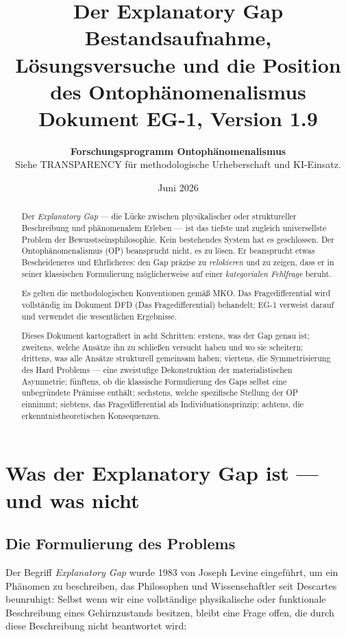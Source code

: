 \documentclass[11pt,a4paper]{article}
\title{
  \textbf{Der Explanatory Gap}\\[0.4em]
  \large Bestandsaufnahme, L\"{o}sungsversuche und die Position\\
  des Ontoph\"{a}nomenalismus\\[0.5em]
  {\normalsize Dokument EG-1, Version 1.9}
}
\author{
  \textbf{Forschungsprogramm Ontoph\"{a}nomenalismus}\\
  \small Siehe TRANSPARENCY f\"{u}r methodologische Urheberschaft und KI-Einsatz.
}
\date{Juni 2026}
\theoremstyle{plain}
\theoremstyle{definition}
\begin{document}
\maketitle

\begin{abstract}
Der \emph{Explanatory Gap} --- die L\"{u}cke zwischen physikalischer oder struktureller
Beschreibung und ph\"{a}nomenalem Erleben --- ist das tiefste und zugleich universellste
Problem der Bewusstseinsphilosophie. Kein bestehendes System hat es geschlossen. Der
Ontoph\"{a}nomenalismus (OP) beansprucht nicht, es zu l\"{o}sen. Er beansprucht etwas
Bescheideneres und Ehrlicheres: den Gap pr\"{a}zise zu \emph{relokieren} und zu zeigen,
dass er in seiner klassischen Formulierung m\"{o}glicherweise auf einer \emph{kategorialen
Fehlfrage} beruht.

Es gelten die methodologischen Konventionen gem\"{a}\ss{} MKO. Das Fragedifferential
wird vollst\"{a}ndig im Dokument DFD (Das Fragedifferential) behandelt; EG-1 verweist
darauf und verwendet die wesentlichen Ergebnisse.

Dieses Dokument kartografiert in acht Schritten: erstens, was der Gap genau ist;
zweitens, welche Ans\"{a}tze ihn zu schlie\ss{}en versucht haben und wo sie scheitern;
drittens, was alle Ans\"{a}tze strukturell gemeinsam haben; viertens, die Symmetrisierung
des Hard Problems --- eine zweistufige Dekonstruktion der materialistischen Asymmetrie;
f\"{u}nftens, ob die klassische Formulierung des Gaps selbst eine unbegr\"{u}ndete
Pr\"{a}misse enth\"{a}lt; sechstens, welche spezifische Stellung der OP einnimmt;
siebtens, das Fragedifferential als Individuationsprinzip; achtens, die
erkenntnistheoretischen Konsequenzen.
\end{abstract}

\tableofcontents
\newpage

\section{Was der Explanatory Gap ist --- und was nicht}

\subsection{Die Formulierung des Problems}

Der Begriff \emph{Explanatory Gap} wurde 1983 von Joseph Levine eingef\"{u}hrt, um ein
Ph\"{a}nomen zu beschreiben, das Philosophen und Wissenschaftler seit Descartes beunruhigt:
Selbst wenn wir eine vollst\"{a}ndige physikalische oder funktionale Beschreibung eines
Gehirnzustands besitzen, bleibt eine Frage offen, die durch diese Beschreibung nicht
beantwortet wird:
\end{document}
